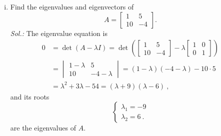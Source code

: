 \begin{example}
\label{expl:evs}
	\begin{enumerate}[(i)]
	\item Find the eigenvalues and eigenvectors of
		\[ A = \begin{bmatrix}
		1 & 5 \\ 10 & -4 
		\end{bmatrix}. \]
		{\it Sol.:}
		The eigenvalue equation is 
		\begin{equation*}
		\begin{split}
		0 & = \det (A-\lambda I) =\det \left( 
		\begin{bmatrix}
		1 & 5 \\ 10 & -4
		\end{bmatrix} - \lambda \begin{bmatrix}
		1 & 0 \\ 0 & 1
		\end{bmatrix}
		\right) \\ 
		& = \begin{vmatrix}  
		1 - \lambda & 5 \\ 10 & -4 - \lambda
		\end{vmatrix} = (1-\lambda)(-4-\lambda)-10 \cdot 5\\ 
		& = \lambda^2 +3\lambda -54 = (\lambda+9)(\lambda-6) \:,
		\end{split}
		\end{equation*}
		and its roots 
		\[ \begin{cases} \lambda_1 = -9 \\ \lambda_2 = 6 \:. \end{cases}  \]
		are the eigenvalues of $A$.
		

\end{enumerate}
\end{example}
